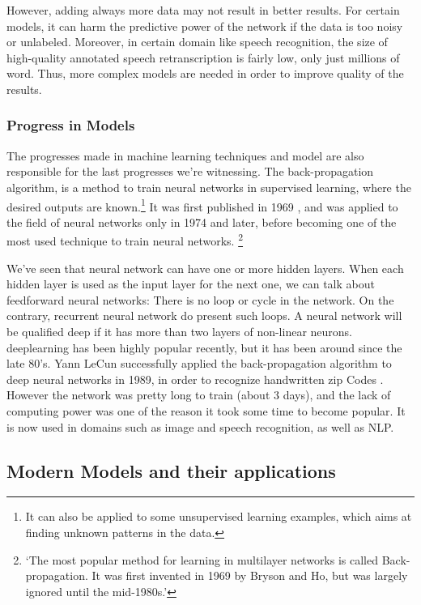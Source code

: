 \documentclass[12pt]{article}
\begin{document}
However, adding always more data may not result in better results. For certain
models, it can harm the predictive power of the network if the data is too noisy
or unlabeled. \cite{trainingData} Moreover, in certain domain like speech
recognition, the size of high-quality annotated speech retranscription is fairly
low, only just millions of word. Thus, more complex models are needed in order
to improve quality of the results.


\subsubsection{Progress in Models}

The progresses made in machine learning techniques and model are also
responsible for the last progresses we're witnessing. The back-propagation
algorithm, is a method to train neural networks in supervised learning, where
the desired outputs are known.\footnote{It can also be applied to some
unsupervised learning examples, which aims at finding unknown patterns in the
data.} It was first published in 1969 \cite{backpropagation}, and was applied to
the field of neural networks only in 1974 and later, before becoming one of the
most used technique to train neural networks.
\footnote{\lq The most popular
method for learning in multilayer networks is called Back-propagation. It was
first invented in 1969 by Bryson and Ho, but was largely ignored until the
mid-1980s.\rq  \cite{RusselAI}}

We've seen that neural network can have one or more hidden layers. When each
hidden layer is used as the input layer for the next one, we can talk about
feedforward neural networks: There is no loop or cycle in the network. On the
contrary, recurrent neural network do present such loops. A neural network
will be qualified deep if it has more than two layers of non-linear neurons.
\gls{deeplearning} has been highly popular recently, but it has been around since the late
80's. Yann LeCun successfully applied the back-propagation algorithm to deep neural
networks in 1989, in order to recognize handwritten zip Codes \cite{lecun}.
However the network was pretty long to train (about 3 days), and the lack of computing
power was one of the reason it took some time to become popular. It is now
used in domains such as image and speech recognition, as well as NLP.


\pagebreak

\subsection{Modern Models and their applications}
\end{document}
